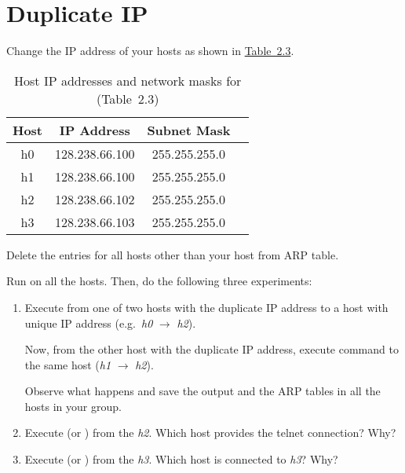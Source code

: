 \documentclass{../UTNetLab}
\begin{document}
\section{Duplicate IP}\label{sec:duplicate-ip}
Change the IP address of your hosts as shown in \hyperref[tab:2.3]{Table~2.3}.

\begin{table}[H]
    \caption{Host IP addresses and network masks for  (Table~2.3)}\label{tab:2.3}
    \centering
    \begin{tabular}{ c c c c }
        \hline \hline
        Host & IP Address     & Subnet Mask   \\
        \hline
        h0   & 128.238.66.100 & 255.255.255.0 \\
        h1   & 128.238.66.100 & 255.255.255.0 \\
        h2   & 128.238.66.102 & 255.255.255.0 \\
        h3   & 128.238.66.103 & 255.255.255.0 \\
        \hline \hline
    \end{tabular}
\end{table}

Delete the entries for all hosts other than your host from ARP table.

Run  on all the hosts.
Then, do the following three experiments:

\begin{enumerate}
    \item Execute  from one of two hosts with the duplicate IP address to a host with unique IP address (e.g.\ \textit{h0} $\rightarrow$ \textit{h2}).

          Now, from the other host with the duplicate IP address, execute  command to the same host (\textit{h1} $\rightarrow$ \textit{h2}).

          Observe what happens and save the  output and the ARP tables in all the hosts in your group.

    \item Execute  (or ) from the \textit{h2}.
          Which host provides the telnet connection?
          Why?

    \item Execute  (or ) from the \textit{h3}.
          Which host is connected to \textit{h3}? Why?
\end{enumerate}
\end{document}
